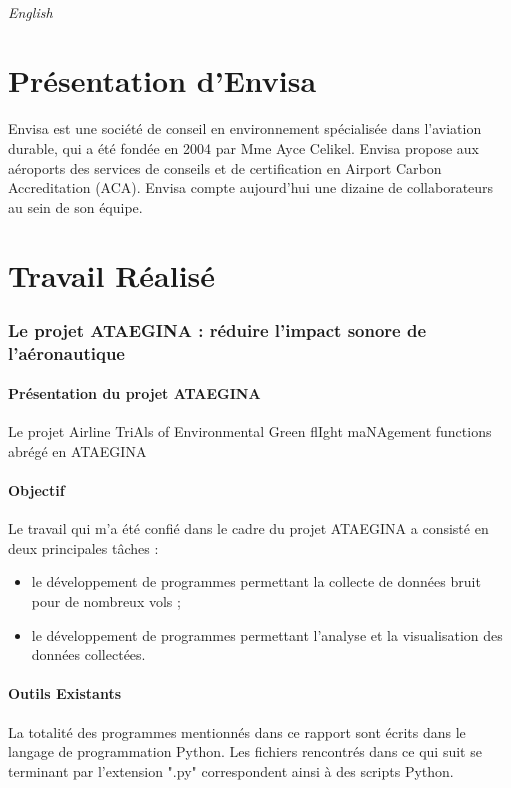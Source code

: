 \documentclass[a4paper]{article}
\begin{document}
    \paragraph{English}
    \lipsum[1]
    \newpage
    
    \part{Présentation d'Envisa}
    Envisa est une société de conseil en environnement spécialisée dans l'aviation durable, qui a été fondée en 2004 par Mme Ayce Celikel. Envisa propose aux aéroports des services de conseils et de certification en Airport Carbon Accreditation (ACA). Envisa compte aujourd'hui une dizaine de collaborateurs au sein de son équipe.
    \newpage
    
    \part{Travail Réalisé}
    \section{Le projet ATAEGINA : réduire l'impact sonore de l'aéronautique}
    \subsection{Présentation du projet ATAEGINA}
    Le projet Airline TriAls of Environmental Green flIght maNAgement functions abrégé en ATAEGINA 
    
    \subsection{Objectif}
    Le travail qui m'a été confié dans le cadre du projet ATAEGINA a consisté en deux principales tâches :
    \begin{itemize}
        \item le développement de programmes permettant la collecte de données bruit pour de nombreux vols ;
        \item le développement de programmes permettant l'analyse et la visualisation des données collectées.
    \end{itemize}
    
    \subsection{Outils Existants}
    La totalité des programmes mentionnés dans ce rapport sont écrits dans le langage de programmation Python. Les fichiers rencontrés dans ce qui suit se terminant par l'extension ".py" correspondent ainsi à des scripts Python.
\end{document}
